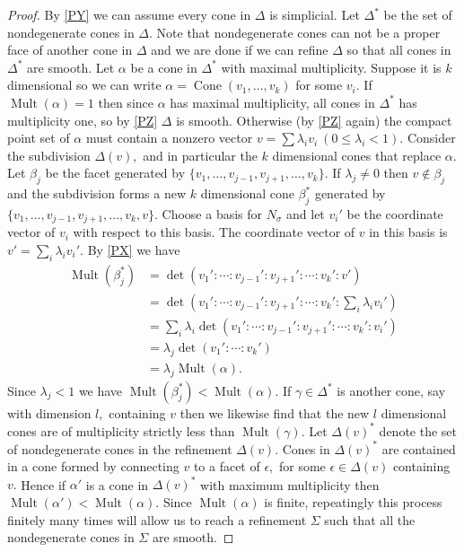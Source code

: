 \documentclass[BSc]{usydthesis}
\numberwithin{equation}{chapter}
\theoremstyle{remark}
\newcommand{\M}{\operatorname{Mult}}
\DeclareMathOperator{\Cone}{Cone}
\begin{document}
\begin{proof}
 By \ref{PY} we can assume every cone in $\Delta$ is simplicial. Let $\Delta^*$ be the set of nondegenerate cones in $\Delta.$ Note that nondegenerate cones can not be a proper face of another cone in $\Delta$ and we are done if we can refine $\Delta$ so that all cones in $\Delta^*$ are smooth. Let $\alpha$ be a cone in $\Delta^*$ with maximal multiplicity. Suppose it is $k$ dimensional so we can write $\alpha = \Cone(v_1,\ldots, v_k)$ for some $v_i.$ If $\M(\alpha)=1$ then since $\alpha$ has maximal multiplicity, all cones in $\Delta^*$ has multiplicity one, so by \ref{PZ} $\Delta$ is smooth. Otherwise (by \ref{PZ} again) the compact point set of $\alpha$ must contain a nonzero vector $v=\sum \lambda_i v_i \ (0\leq \lambda_i <1).$ Consider the subdivision $\Delta(v),$ and in particular the $k$ dimensional cones that replace $\alpha.$ Let $\beta_j$ be the facet generated by $\{ v_1, \ldots, v_{j-1}, v_{j+1}, \ldots, v_k\}.$ If $\lambda_j\neq 0$ then $v\notin \beta_j$ and the subdivision forms a new $k$ dimensional cone $\beta_j^*$ generated by $\{ v_1, \ldots, v_{j-1}, v_{j+1}, \ldots, v_k, v\}.$ Choose a basis for $N_{\sigma}$ and let $v_i'$ be the coordinate vector of $v_i$ with respect to this basis. The coordinate vector of $v$ in this basis is $v' = \sum_{i} \lambda_i v_i'.$ By \ref{PX} we have 
 \begin{align*}
  \M(\beta_j^*) &= \det( v_1' : \cdots : v_{j-1}': v_{j+1}':\cdots: v_k':v') \\
   &= \det\left( v_1' : \cdots : v_{j-1}': v_{j+1}':\cdots: v_k':\sum_i \lambda_i v_i'\right) \\
   &= \sum_i \lambda_i \det( v_1' : \cdots : v_{j-1}': v_{j+1}':\cdots: v_k':v_i')\\
   &= \lambda_j \det(v_1':\cdots: v_k')\\
   &= \lambda_j \M(\alpha).
 \end{align*}
Since $\lambda_j <1$ we have $\M(\beta_j^*) < \M(\alpha).$ If $\gamma\in \Delta^*$ is another cone, say with dimension $l,$ containing $v$ then we likewise find that the new $l$ dimensional cones are of multiplicity strictly less than $\M(\gamma).$ Let $\Delta(v)^*$ denote the set of nondegenerate cones in the refinement $\Delta(v).$ Cones in $\Delta(v)^*$ are contained in a cone formed by connecting $v$ to a facet of $\epsilon,$ for some $\epsilon\in \Delta(v)$ containing $v.$ Hence if $\alpha'$ is a cone in $\Delta(v)^*$ with maximum multiplicity then $\M(\alpha') < \M(\alpha).$ Since $\M(\alpha)$ is finite, repeatingly this process finitely many times will allow us to reach a refinement $\Sigma$ such that all the nondegenerate cones in $\Sigma$ are smooth. 
\end{proof}
\end{document}
